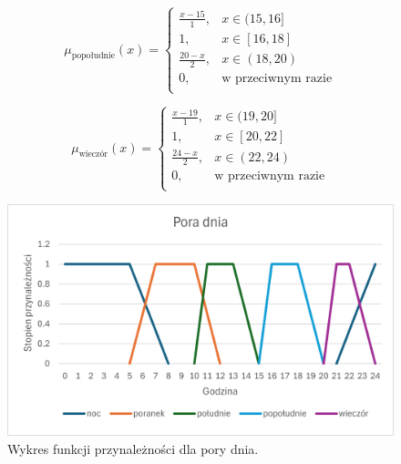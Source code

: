 \documentclass{article}
\begin{document}
\begin{enumerate}
        \begin{equation}
            \mu_{\text{popołudnie}}(x) =
            \begin{cases}
            \frac{x - 15}{1}, & x \in (15, 16] \\
            1, & x \in [16, 18] \\
            \frac{20 - x}{2}, & x \in (18, 20) \\
            0, & \text{w przeciwnym razie} \\
             \end{cases}
        \end{equation}

        \begin{equation}
            \mu_{\text{wieczór}}(x) =
            \begin{cases}
            \frac{x - 19}{1}, & x \in (19, 20] \\
            1, & x \in [20, 22] \\
            \frac{24 - x}{2}, & x \in (22, 24) \\
            0, & \text{w przeciwnym razie} \\
            \end{cases}
        \end{equation} 
        
    \begin{figure}[H]
    \centering
    \includegraphics[width=\textwidth]{img/day.png}
    \caption{Wykres funkcji przynależności dla pory dnia.}
    \end{figure}
    

\end{enumerate}
\end{document}
